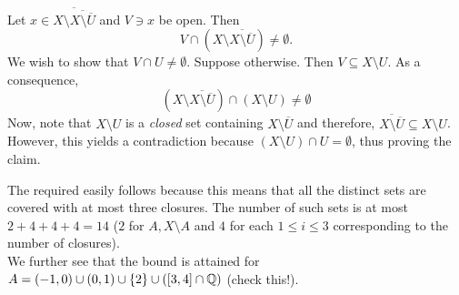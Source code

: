 \begin{solution*}
	Let $x\in \overline{X\setminus\overline{X\setminus \overline{U}}}$ and $V\ni x$ be open. Then
	\[ V\cap \left( X\setminus\overline{X\setminus \overline{U}} \right) \neq \emptyset. \]
	We wish to show that $V \cap U \neq \emptyset$.
	Suppose otherwise. Then $V \subseteq X\setminus U$.
	As a consequence,
	\[ \left(X\setminus\overline{X\setminus \overline{U}}\right) \cap (X\setminus U) \neq \emptyset \]
	Now, note that $X\setminus U$ is a \textit{closed} set containing $X\setminus \overline{U}$ and therefore, $\overline{X\setminus \overline{U}}\subseteq X\setminus U$. However, this yields a contradiction because $(X\setminus U) \cap U = \emptyset$, thus proving the claim.

	The required easily follows because this means that all the distinct sets are covered with at most three closures. The number of such sets is at most $2+4+4+4=14$ ($2$ for $A, X\setminus A$ and $4$ for each $1\leq i\leq 3$ corresponding to the number of closures).\\

	We further see that the bound is attained for $A = (-1,0)\cup(0,1)\cup\{2\}\cup([3,4]\cap\mathbb{Q})$ (check this!).
\end{solution*}